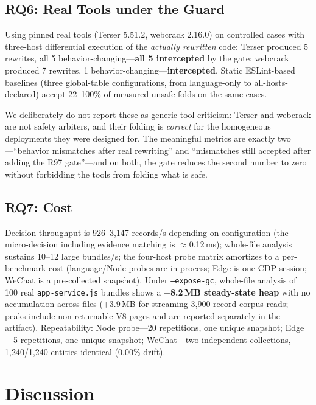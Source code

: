 \documentclass[sigconf,nonacm]{acmart}
\begin{document}
\subsection{RQ6: Real Tools under the Guard}\label{sec:rq6}

Using pinned real tools (Terser 5.51.2, webcrack 2.16.0) on controlled cases with three-host differential execution of the \emph{actually rewritten} code: Terser produced 5 rewrites, all 5 behavior-changing---\textbf{all 5 intercepted} by the gate; webcrack produced 7 rewrites, 1 behavior-changing---\textbf{intercepted}. Static ESLint-based baselines (three global-table configurations, from language-only to all-hosts-declared) accept 22--100\% of measured-unsafe folds on the same cases.

We deliberately do not report these as generic tool criticism: Terser and webcrack are not safety arbiters, and their folding is \emph{correct} for the homogeneous deployments they were designed for. The meaningful metrics are exactly two---``behavior mismatches after real rewriting'' and ``mismatches still accepted after adding the R97 gate''---and on both, the gate reduces the second number to zero without forbidding the tools from folding what is safe.

\subsection{RQ7: Cost}\label{sec:rq7}

Decision throughput is 926--3{,}147 records/s depending on configuration (the micro-decision including evidence matching is $\approx$0.12\,ms); whole-file analysis sustains 10--12 large bundles/s; the four-host probe matrix amortizes to a per-benchmark cost (language/Node probes are in-process; Edge is one CDP session; WeChat is a pre-collected snapshot). Under \texttt{--expose-gc}, whole-file analysis of 100 real \texttt{app-service.js} bundles shows a \textbf{$+$8.2\,MB steady-state heap} with no accumulation across files ($+$3.9\,MB for streaming 3{,}900-record corpus reads; peaks include non-returnable V8 pages and are reported separately in the artifact). Repeatability: Node probe---20 repetitions, one unique snapshot; Edge---5 repetitions, one unique snapshot; WeChat---two independent collections, 1{,}240/1{,}240 entities identical (0.00\% drift).

\section{Discussion}\label{sec:discussion}
\end{document}
